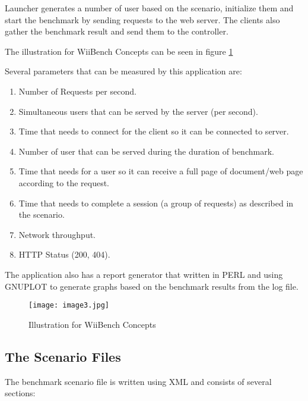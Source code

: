 \documentclass[final,
notitlepage,
narroweqnarray,
    inline,
    twoside,
]{ieee}
\begin{document}
Launcher generates a number of user based on the scenario,
initialize them and start the benchmark by sending requests to the
web server. The clients also gather the benchmark result and send
them to the controller.

The illustration for WiiBench Concepts can be seen in figure
\ref{image3}

Several parameters that can be measured by this application are:

\begin{enumerate}
\item Number of Requests per second.

\item Simultaneous users that can be served by the server (per
second).

\item Time that needs to connect for the client so it can be
connected to server.

\item Number of user that can be served during the duration of
benchmark.

\item Time that needs for a user so it can receive a full page of
document/web page according to the request.

\item Time that needs to complete a session (a group of requests)
as described in the scenario.

\item Network throughput.

\item  HTTP Status (200, 404).
\end{enumerate}


The application also has a report generator that written in PERL
and using GNUPLOT to generate graphs based on the benchmark
results from the log file.

\begin{figure}[htbp]
\texttt{[image: image3.jpg]}
\caption{Illustration for WiiBench Concepts} \label{image3}
\end{figure}




\subsection{The Scenario Files}

The benchmark scenario file is written using XML and consists of several sections:
\end{document}
